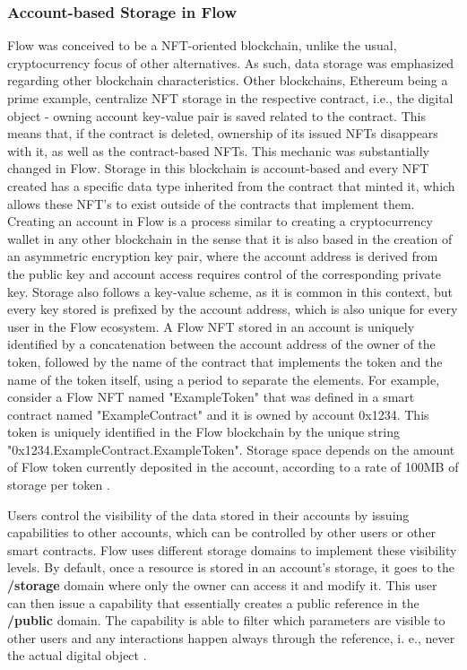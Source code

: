 \documentclass[../main.tex]{subfiles}
\begin{document}
\subsubsection{Account-based Storage in Flow}
Flow was conceived to be a NFT-oriented blockchain, unlike the usual, cryptocurrency focus of other alternatives. As such, data storage was emphasized regarding other blockchain characteristics. Other blockchains, Ethereum being a prime example, centralize NFT storage in the respective contract, i.e., the digital object - owning account key-value pair is saved related to the contract. This means that, if the contract is deleted, ownership of its issued NFTs disappears with it, as well as the contract-based NFTs. This mechanic was substantially changed in Flow. Storage in this blockchain is account-based and every NFT created has a specific data type inherited from the contract that minted it, which allows these NFT's to exist outside of the contracts that implement them. Creating an account in Flow is a process similar to creating a cryptocurrency wallet in any other blockchain in the sense that it is also based in the creation of an asymmetric encryption key pair, where the account address is derived from the public key and account access requires control of the corresponding private key. Storage also follows a key-value scheme, as it is common in this context, but every key stored is prefixed by the account address, which is also unique for every user in the Flow ecosystem. A Flow NFT stored in an account is uniquely identified by a concatenation between the account address of the owner of the token, followed by the name of the contract that implements the token and the name of the token itself, using a period to separate the elements. For example, consider a Flow NFT named "ExampleToken" that was defined in a smart contract named "ExampleContract" and it is owned by account 0x1234. This token is uniquely identified in the Flow blockchain by the unique string "0x1234.ExampleContract.ExampleToken". Storage space depends on the amount of Flow token currently deposited in the account, according to a rate of 100MB of storage per token \cite{flow2020b}.
\par
Users control the visibility of the data stored in their accounts by issuing capabilities to other accounts, which can be controlled by other users or other smart contracts. Flow uses different storage domains to implement these visibility levels. By default, once a resource is stored in an account's storage, it goes to the \textbf{/storage} domain where only the owner can access it and modify it. This user can then issue a capability that essentially creates a public reference in the \textbf{/public} domain. The capability is able to filter which parameters are visible to other users and any interactions happen always through the reference, i. e., never the actual digital object \cite{Hentschel2019a}.
\end{document}
